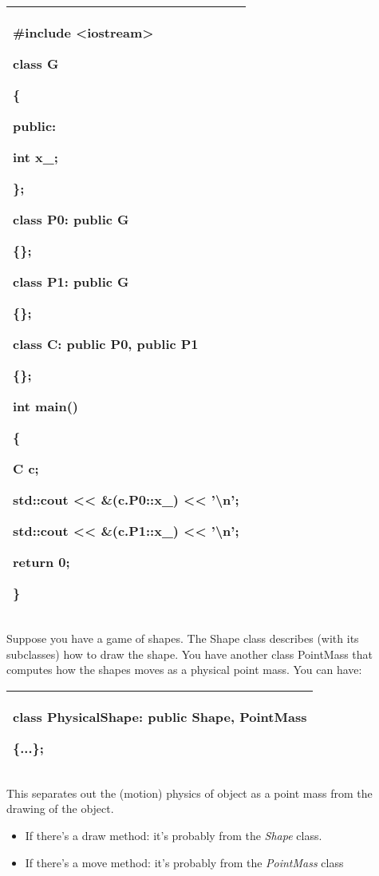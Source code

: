 \documentclass[
]{article}
\providecommand{\tightlist}{%
  \setlength{\itemsep}{0pt}\setlength{\parskip}{0pt}}
\begin{document}
\begin{longtable}[]{@{}l@{}}
\toprule
\endhead
\begin{minipage}[t]{0.97\columnwidth}\raggedright
\#include \textless iostream\textgreater{}

class G

\{

public:

int x\_;

\};

class P0: public G

\{\};

class P1: public G

\{\};

class C: public P0, public P1

\{\};

int main()

\{

C c;

std::cout \textless\textless{} \&(c.P0::x\_) \textless\textless{}
'\textbackslash n';

std::cout \textless\textless{} \&(c.P1::x\_) \textless\textless{}
'\textbackslash n';

return 0;

\}\strut
\end{minipage}\tabularnewline
\bottomrule
\end{longtable}

Suppose you have a game of shapes. The Shape class describes (with its
subclasses) how to draw the shape. You have another class PointMass that
computes how the shapes moves as a physical point mass. You can have:

\begin{longtable}[]{@{}l@{}}
\toprule
\endhead
\begin{minipage}[t]{0.97\columnwidth}\raggedright
class PhysicalShape: public Shape, PointMass

\{...\};\strut
\end{minipage}\tabularnewline
\bottomrule
\end{longtable}

This separates out the (motion) physics of object as a point mass from
the drawing of the object.

\begin{itemize}
\tightlist
\item
  If there's a draw method: it's probably from the \emph{Shape} class.
\item
  If there's a move method: it's probably from the \emph{PointMass}
  class
\end{itemize}
\end{document}
